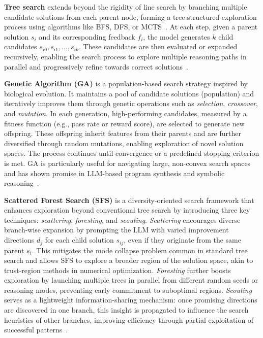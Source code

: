\documentclass{article} %
\theoremstyle{definition}
\theoremstyle{remark}
\begin{document}
\textbf{Tree search} extends beyond the rigidity of line search by branching multiple candidate solutions from each parent node, forming a tree-structured exploration process using algorithms like BFS, DFS, or MCTS~\citep{zhou2024language, yao2023tree, wan2024alphazerolike, tian2024toward}. At each step, given a parent solution $s_i$ and its corresponding feedback $f_i$, the model generates $k$ child candidates $s_{i0}, s_{i1}, \dots, s_{ik}$. These candidates are then evaluated or expanded recursively, enabling the search process to explore multiple reasoning paths in parallel and progressively refine towards correct solutions~\citep{light2025strategist}.




\textbf{Genetic Algorithm (GA)} is a population-based search strategy inspired by biological evolution. It maintains a pool of candidate solutions (population) and iteratively improves them through genetic operations such as \emph{selection}, \emph{crossover}, and \emph{mutation}. In each generation, high-performing candidates, measured by a fitness function (e.g., pass rate or reward score), are selected to generate new offspring. These offspring inherit features from their parents and are further diversified through random mutations, enabling exploration of novel solution spaces. The process continues until convergence or a predefined stopping criterion is met. GA is particularly useful for navigating large, non-convex search spaces and has shown promise in LLM-based program synthesis and symbolic reasoning~\citep{FunSearch2023}.



\textbf{Scattered Forest Search (SFS)} is a diversity-oriented search framework that enhances exploration beyond conventional tree search by introducing three key techniques: \emph{scattering}, \emph{foresting}, and \emph{scouting}. \emph{Scattering} encourages diverse branch-wise expansion by prompting the LLM with varied improvement directions $d_j$ for each child solution $s_{ij}$, even if they originate from the same parent $s_i$. This mitigates the mode collapse problem common in standard tree search and allows SFS to explore a broader region of the solution space, akin to trust-region methods in numerical optimization. \emph{Foresting} further boosts exploration by launching multiple trees in parallel from different random seeds or reasoning modes, preventing early commitment to suboptimal regions. \emph{Scouting} serves as a lightweight information-sharing mechanism: once promising directions are discovered in one branch, this insight is propagated to influence the search heuristics of other branches, improving efficiency through partial exploitation of successful patterns~\citep{light2025sfs}.
\end{document}
